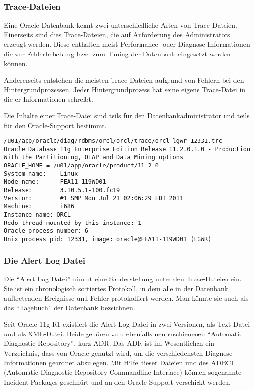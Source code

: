           \subsubsection{Trace-Dateien}
            Eine Oracle-Datenbank kennt zwei unterschiedliche Arten von Trace-Dateien. Einerseits sind dies Trace-Dateien, die auf Anforderung des Administrators erzeugt werden. Diese enthalten meist Performance- oder Diagnose-Informationen die zur Fehlerbehebung bzw. zum Tuning der Datenbank eingesetzt werden können.

            Andererseits entstehen die meisten Trace-Dateien aufgrund von Fehlern bei den Hintergrundprozessen. Jeder Hintergrundprozess hat seine eigene Trace-Datei in die er Informationen schreibt.

						Die Inhalte einer Trace-Datei sind teils für den Datenbankadministrator und teils für den Oracle-Support bestimmt.

            \begin{lstlisting}[caption={Eine Tracedatei des Log Writers},
            label=orcl_lgwr_12331,emph={[9]ORACLE_HOME},emphstyle={[9]\color{black}},language=terminal]
/u01/app/oracle/diag/rdbms/orcl/orcl/trace/orcl_lgwr_12331.trc 
Oracle Database 11g Enterprise Edition Release 11.2.0.1.0 - Production
With the Partitioning, OLAP and Data Mining options
ORACLE_HOME = /u01/app/oracle/product/11.2.0
System name:    Linux
Node name:      FEA11-119WD01
Release:        3.10.5.1-100.fc19
Version:        #1 SMP Mon Jul 21 02:06:29 EDT 2011
Machine:        i686
Instance name: ORCL
Redo thread mounted by this instance: 1
Oracle process number: 6
Unix process pid: 12331, image: oracle@FEA11-119WD01 (LGWR)
            \end{lstlisting}
					\subsubsection{Die Alert Log Datei}
						Die \enquote{Alert Log Datei} nimmt eine Sonderstellung unter den Trace-Dateien ein. Sie ist ein chronologisch sortiertes Protokoll, in dem alle in der Datenbank auftretenden Ereignisse und Fehler protokolliert werden. Man könnte sie auch als das \enquote{Tagebuch} der Datenbank bezeichnen.

						Seit Oracle 11g R1 existiert die Alert Log Datei in zwei Versionen, als Text-Datei und als XML-Datei. Beide gehören zum ebenfalls neu erschienenen \enquote{Automatic Diagnostic Repository}, kurz ADR. Das ADR ist im Wesentlichen ein Verzeichnis, dass von Oracle genutzt wird, um die verschiedensten Diagnose-Informationen geordnet abzulegen. Mit Hilfe dieser Dateien und des ADRCI (Automatic Diagnostic Repository Commandline Interface) können sogenannte Incident Packages geschnürt und an den Oracle Support verschickt werden.

